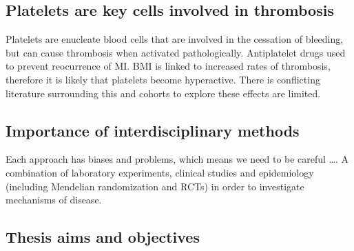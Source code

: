 \documentclass[11pt,twoside]{bristolthesis}
\begin{document}
\hypertarget{platelets-are-key-cells-involved-in-thrombosis}{%
\subsection{Platelets are key cells involved in thrombosis}\label{platelets-are-key-cells-involved-in-thrombosis}}

Platelets are enucleate blood cells that are involved in the cessation of bleeding, but can cause thrombosis when activated pathologically.
Antiplatelet drugs used to prevent reocurrence of MI.
BMI is linked to increased rates of thrombosis, therefore it is likely that platelets become hyperactive. There is conflicting literature surrounding this and cohorts to explore these effects are limited.

\hypertarget{importance-of-interdisciplinary-methods}{%
\subsection{Importance of interdisciplinary methods}\label{importance-of-interdisciplinary-methods}}

Each approach has biases and problems, which means we need to be careful \ldots.
A combination of laboratory experiments, clinical studies and epidemiology (including Mendelian randomization and RCTs) in order to investigate mechanisms of disease.

\hypertarget{thesis-aims-and-objectives}{%
\subsection{Thesis aims and objectives}\label{thesis-aims-and-objectives}}
\end{document}
